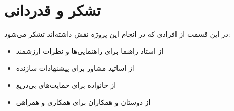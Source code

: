 \chapter*{تشکر و قدردانی}

در این قسمت از افرادی که در انجام این پروژه نقش داشته‌اند تشکر می‌شود:

\begin{itemize}
    \item از استاد راهنما برای راهنمایی‌ها و نظرات ارزشمند
    \item از اساتید مشاور برای پیشنهادات سازنده
    \item از خانواده برای حمایت‌های بی‌دریغ
    \item از دوستان و همکاران برای همکاری و همراهی
\end{itemize}

\newpage

